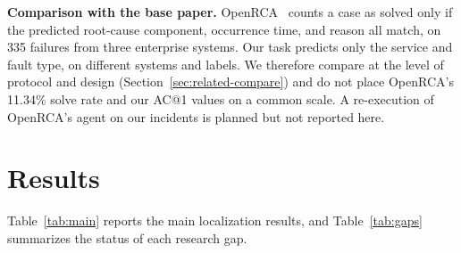 \documentclass[conference]{IEEEtran}
\begin{document}
\textbf{Comparison with the base paper.} OpenRCA~\cite{xu2025openrca} counts a case as solved only if the predicted root-cause component, occurrence time, and reason all match, on 335 failures from three enterprise systems. Our task predicts only the service and fault type, on different systems and labels. We therefore compare at the level of protocol and design (Section~\ref{sec:related-compare}) and do not place OpenRCA's 11.34\% solve rate and our AC@1 values on a common scale. A re-execution of OpenRCA's agent on our incidents is planned but not reported here.

\section{Results}\label{sec:results}

Table~\ref{tab:main} reports the main localization results, and Table~\ref{tab:gaps} summarizes the status of each research gap.

\begin{table}[t]
\centering
\caption{Service-level localization on 101 incidents. OB and TT columns give AC@1 per system. FT: fault-type accuracy given a correct top-1 service.}
\label{tab:main}
\footnotesize
\setlength{\tabcolsep}{3.2pt}
\end{table}
\end{document}
